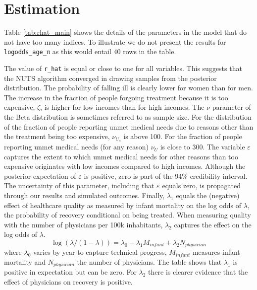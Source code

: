 \documentclass[a4paper,12pt]{article}
\begin{document}
\section{Estimation}
\label{sec:orge9f2624}

Table \ref{tab:rhat_main} shows the details of the parameters in the model that do not have too many indices. To illustrate we do not present the results for \texttt{logodds\_age\_π} as this would entail 40 rows in the table.

The value of \texttt{r\_hat} is equal or close to one for all variables. This suggests that the NUTS algorithm converged in drawing samples from the posterior distribution. The probability of falling ill is clearly lower for women than for men. The increase in the fraction of people forgoing treatment because it is too expensive, \(\zeta\), is higher for low incomes than for high incomes. The \(\nu\) parameter of the Beta distribution is sometimes referred to as sample size. For the distribution of the fraction of people reporting unmet medical needs due to reasons other than the treatment being too expensive, \(\nu_{U_{o}}\) is above 100. For the fraction of people reporting unmet medical needs (for any reason) \(\nu_U\) is close to 300. The variable \(\varepsilon\) captures the extent to which unmet medical needs for other reasons than too expensive originates with low incomes compared to high incomes. Although the posterior expectation of \(\varepsilon\) is positive, zero is part of the 94\% credibility interval. The uncertainty of this parameter, including that \(\varepsilon\) equals zero, is propagated through our results and simulated outcomes. Finally, \(\lambda_1\) equals the (negative) effect of healthcare quality as measured by infant mortality on the log odds of \(\lambda\), the probability of recovery conditional on being treated. When measuring quality with the number of physicians per 100k inhabitants, \(\lambda_2\) captures the effect on the log odds of \(\lambda\).
\begin{equation}
\label{eq:lambda}
\log(\lambda/(1-\lambda)) = \lambda_0 - \lambda_1 M_{infant} + \lambda_2 N_{physician}
\end{equation}
where \(\lambda_0\) varies by year to capture technical progress, \(M_{infant}\) measures infant mortality and \(N_{physician}\) the number of physicians. The table shows that \(\lambda_1\) is positive in expectation but can be zero. For \(\lambda_2\) there is clearer evidence that the effect of physicians on recovery is positive.
\end{document}
